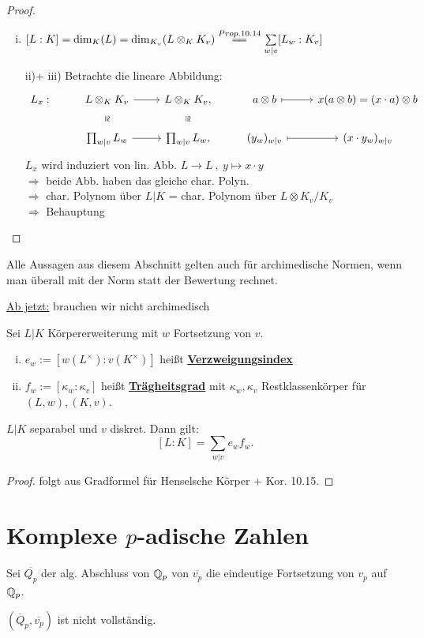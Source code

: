 \begin{proof}
\begin{enumerate}[i)]
\item $[L:K]=\dim_K(L)=\dim_{K_v}(L \otimes_K K_v) \stackrel{Prop. 10.14}{=\joinrel=} \sum\limits_{w|v} [L_w:K_v]$
\item [ii)+ iii)] Betrachte die lineare Abbildung:
\[
\begin{tikzcd}
L_x: & L \otimes_K K_v \arrow[r] \arrow[draw=none]{d}[auto=false, sloped]{\cong} & L \otimes_K K_v, \arrow[draw=none]{d}[auto=false, sloped]{\cong} & a \otimes b \arrow[r, mapsto] & x(a \otimes b)=(x\cdot a) \otimes b \\
&\prod_{w|v} L_w \arrow[r] & \prod_{w|v} L_w, & (y_w)_{w|v} \arrow[r, mapsto] & (x \cdot y_w)_{w|v}
\end{tikzcd}
\]
$L_x$ wird induziert von lin. Abb. $L \to L \ , \ y \mapsto x \cdot y$\\
$\Rightarrow$ beide Abb. haben das gleiche char. Polyn.\\
$\Rightarrow$ char. Polynom über $L|K$ = char. Polynom über $L \otimes K_v / K_v$\\
$\Rightarrow$ Behauptung
\end{enumerate}
\end{proof}

\begin{Bem}
Alle Aussagen aus diesem Abschnitt gelten auch für archimedische Normen, wenn man überall mit der Norm statt der Bewertung rechnet.
\end{Bem}

\underline{Ab jetzt:} brauchen wir nicht archimedisch

\begin{defi}
Sei $L|K$ Körpererweiterung mit $w$ Fortsetzung von $v$.
\begin{enumerate}[i)]
\item $e_w:=[w(L^\times):v(K^\times)]$ heißt \underline{\textbf{Verzweigungsindex}}
\item $f_w:=[\kappa_w:\kappa_v]$ heißt \underline{\textbf{Trägheitsgrad}} mit $\kappa_w, \kappa_v$ Restklassenkörper für $(L,w), (K,v)$.
\end{enumerate}
\end{defi}

\begin{Kor}
$L|K$ separabel und $v$ diskret. Dann gilt:
\[ [L:K] = \sum_{w|v} e_w f_w. \]
\end{Kor}

\begin{proof}
folgt aus Gradformel für Henselsche Körper + Kor. 10.15.
\end{proof}

\section{Komplexe $p$-adische Zahlen}
Sei $\overline{Q_p}$ der alg. Abschluss von $\mathbb{Q}_p$ von $\overline{v_p}$ die eindeutige Fortsetzung von $v_p$ auf $\mathbb{Q}_p$.

\begin{Prop}
$(\overline{Q}_p,\overline{v_p})$ ist nicht vollständig.
\end{Prop}